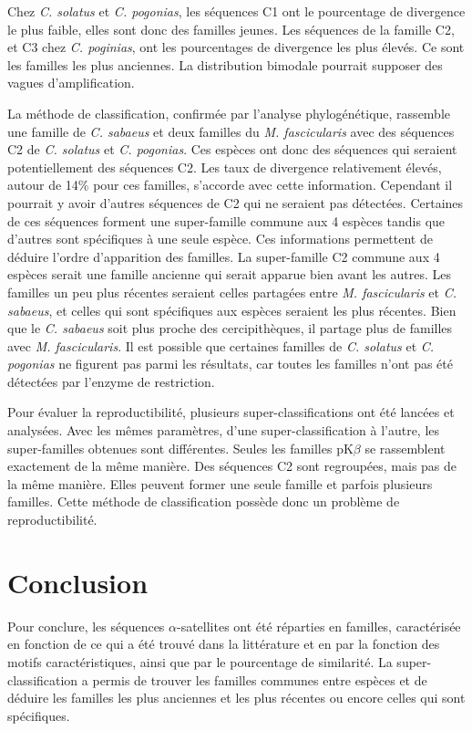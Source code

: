 \documentclass[12pt,a4paper]{article}
\begin{document}
	Chez \textit{C. solatus} et \textit{C. pogonias}, les séquences C1 ont le pourcentage de divergence le plus faible, elles sont donc des familles jeunes. Les séquences de la famille C2, et C3 chez \textit{C. poginias}, ont les pourcentages de divergence les plus élevés. Ce sont les familles les plus anciennes.  La distribution bimodale pourrait supposer des vagues d'amplification.

	La méthode de classification, confirmée par l'analyse phylogénétique, rassemble une famille de \textit{C. sabaeus} et deux familles du \textit{M. fascicularis} avec des séquences C2 de \textit{C. solatus} et \textit{C. pogonias}. Ces espèces ont donc des séquences qui seraient potentiellement des séquences C2. Les taux de divergence relativement élevés, autour de 14\% pour ces familles, s'accorde avec cette information. Cependant il pourrait y avoir d'autres séquences de C2 qui ne seraient pas détectées. Certaines de ces séquences forment une super-famille commune aux 4 espèces tandis que d'autres sont spécifiques à une seule espèce. Ces informations permettent de déduire l'ordre d'apparition des familles. La super-famille C2 commune aux 4 espèces serait une famille ancienne qui serait apparue bien avant les autres. Les familles un peu plus récentes seraient celles partagées entre \textit{M. fascicularis} et \textit{C. sabaeus}, et celles qui sont spécifiques aux espèces seraient les plus récentes. Bien que le \textit{C. sabaeus} soit plus proche des cercipithèques, il partage plus de familles avec \textit{M. fascicularis}. Il est possible que certaines familles de \textit{C. solatus} et \textit{C. pogonias} ne figurent pas parmi les résultats, car toutes les familles n'ont pas été détectées par l'enzyme de restriction. 

	Pour évaluer la reproductibilité,  plusieurs super-classifications ont été lancées et analysées. Avec les mêmes paramètres, d'une super-classification à l'autre, les super-familles obtenues sont différentes. Seules les familles pK$\beta$ se rassemblent exactement de la même manière. Des séquences C2 sont regroupées, mais pas de la même manière. Elles peuvent former une seule famille et parfois plusieurs familles. Cette méthode de classification possède donc un problème de reproductibilité.  
	
\section{Conclusion}
	Pour conclure, les séquences  $\alpha$-satellites ont été réparties en familles, caractérisée en fonction de ce qui a été trouvé dans la littérature et en par la fonction des motifs caractéristiques, ainsi que par le pourcentage de similarité.  La super-classification a permis de trouver les familles communes entre espèces et de déduire les familles les plus anciennes et les plus récentes ou encore celles qui sont spécifiques.
	
\end{document}
